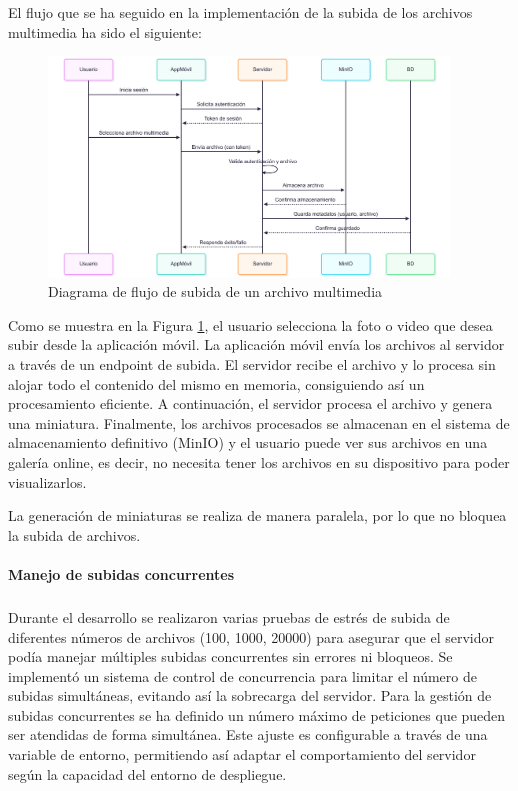 El flujo que se ha seguido en la implementación de la subida de los archivos multimedia ha sido el siguiente:
\begin{figure}[H]
    \begin{center}
        \includegraphics[width=0.95\textwidth]{assets/sprint3/diagrama-subida-archivos.png}
    \end{center}
    \caption{Diagrama de flujo de subida de un archivo multimedia}\label{fig:diagrama-flujo-subida-archivos}
\end{figure}

Como se muestra en la Figura \ref{fig:diagrama-flujo-subida-archivos}, el usuario selecciona la foto o video que desea subir desde la aplicación móvil. La aplicación móvil envía los archivos al servidor a través de un endpoint de subida. El servidor recibe el archivo y lo procesa sin alojar todo el contenido del mismo en memoria, consiguiendo así un procesamiento eficiente. A continuación, el servidor procesa el archivo y genera una miniatura. Finalmente, los archivos procesados se almacenan en el sistema de almacenamiento definitivo (MinIO) y el usuario puede ver sus archivos en una galería online, es decir, no necesita tener los archivos en su dispositivo para poder visualizarlos.

La generación de miniaturas se realiza de manera paralela, por lo que no bloquea la subida de archivos.

\paragraph{Manejo de subidas concurrentes}
\subparagraph{}

Durante el desarrollo se realizaron varias pruebas de estrés de subida de diferentes números de archivos (100, 1000, 20000) para asegurar que el servidor podía manejar múltiples subidas concurrentes sin errores ni bloqueos. Se implementó un sistema de control de concurrencia para limitar el número de subidas simultáneas, evitando así la sobrecarga del servidor.
Para la gestión de subidas concurrentes se ha definido un número máximo de peticiones que pueden ser atendidas de forma simultánea. Este ajuste es configurable a través de una variable de entorno, permitiendo así adaptar el comportamiento del servidor según la capacidad del entorno de despliegue.

